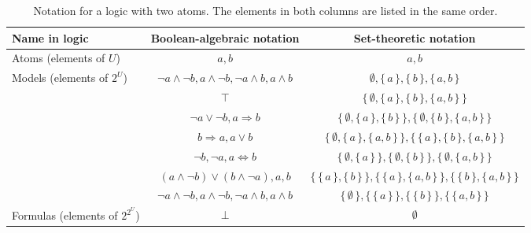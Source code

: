 \begin{sidewaystable}
  \centering
  \begin{tabular}{lcc}
    \toprule
    Name in logic & Boolean-algebraic notation & Set-theoretic notation \\
    \midrule
    Atoms (elements of $U$) & $a, b$ & $a, b$ \\
    \rowcolor{gray!10} Models (elements of $2^U$) & $\neg a \land \neg b, a \land \neg b, \neg a \land b, a \land b$ & $\emptyset, \{\, a \,\}, \{\, b \,\}, \{\, a, b \,\}$ \\
                  & $\top$ & $\{\, \emptyset, \{\, a \,\}, \{\, b \,\}, \{\, a, b \,\} \,\}$ \\
                  & $\neg a \lor \neg b, a \Rightarrow b$ & $\{\, \emptyset, \{\, a \,\}, \{\, b \,\} \,\}, \{\, \emptyset, \{\, b \,\}, \{\, a, b \,\} \,\}$ \\
                  & $b \Rightarrow a, a \lor b$ & $\{\, \emptyset, \{\, a \,\}, \{\, a, b \,\} \,\}, \{\, \{\, a \,\}, \{\, b \,\}, \{\, a, b \,\} \,\}$ \\
                  & $\neg b, \neg a, a \Leftrightarrow b$ & $\{\, \emptyset, \{\, a \,\} \,\}, \{\, \emptyset, \{\, b \,\} \,\}, \{\, \emptyset, \{\, a, b \,\} \,\}$ \\
                  & $(a \land \neg b) \lor (b \land \neg a), a, b$ & $\{\, \{\, a \,\}, \{\, b \,\} \,\}, \{\, \{\, a \,\}, \{\, a, b \,\} \,\}, \{\, \{\, b \,\}, \{\, a, b \,\} \,\}$ \\
                  & $\neg a \land \neg b, a \land \neg b, \neg a \land b, a \land b$ & $\{\, \emptyset \,\}, \{\, \{\, a \,\} \,\}, \{\, \{\, b \,\} \,\}, \{\, \{\, a, b \,\} \,\}$ \\
    \multirow{-7}{*}{Formulas (elements of $2^{2^U}$)} & $\bot$ & $\emptyset$ \\
    \bottomrule
  \end{tabular}
  \caption{Notation for a logic with two atoms. The elements in both columns are
    listed in the same order.}\label{tbl:notation_example}
\end{sidewaystable}

